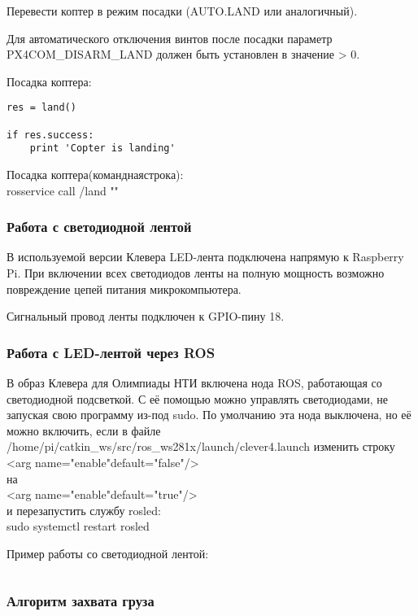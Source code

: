 Перевести коптер в режим посадки (AUTO.LAND или аналогичный).

Для автоматического отключения винтов после посадки параметр\\ PX4COM\_DISARM\_LAND должен быть установлен в значение > 0.

Посадка коптера:
\begin{verbatim}
res = land()
 
if res.success:
	print 'Copter is landing'
\end{verbatim}

Посадка коптера(команднаястрока):\\
rosservice call /land "{}"

\subsubsection*{Работа с светодиодной лентой}

В используемой версии Клевера LED-лента подключена напрямую к Raspberry Pi. При включении всех светодиодов ленты на полную мощность возможно повреждение цепей питания микрокомпьютера.

Сигнальный провод ленты подключен к GPIO-пину 18.

\subsubsection*{Работа с LED-лентой через ROS}

В образ Клевера для Олимпиады НТИ включена нода ROS, работающая со светодиодной подсветкой. С её помощью можно управлять светодиодами, не запуская свою программу из-под sudo. По умолчанию эта нода выключена, но её можно включить, если в файле /home/pi/catkin\_ws/src/ros\_ws281x/launch/clever4.launch изменить строку \\
<arg name="enable"default="false"/>\\
на\\
<arg name="enable"default="true"/>\\
и перезапустить службу rosled:\\
sudo systemctl restart rosled

Пример работы со светодиодной лентой:

\inputminted[fontsize=\footnotesize, linenos]{python}{final/command_tour/ats/task_08/source_4.py}

\subsubsection*{Алгоритм захвата груза}

